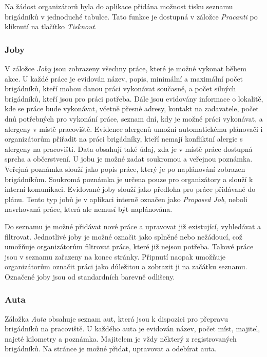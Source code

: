 Na žádost organizátorů byla do aplikace přidána možnost tisku seznamu brigádníků v jednoduché tabulce. Tato funkce je dostupná v záložce \textit{Pracanti} po kliknutí
na tlačítko \textit{Tisknout}.

\subsubsection{Joby}

V záložce \textit{Joby} jsou zobrazeny všechny práce, které je možné vykonat během akce. U každé práce je evidován název, popis, minimální
a maximální počet brigádníků, kteří mohou danou práci vykonávat současně, a počet silných brigádníků, kteří jsou pro práci potřeba. Dále jsou evidovány
informace o lokalitě, kde se práce bude vykonávat, včetně přesné adresy, kontakt na zadavatele, počet dnů potřebných pro vykonání práce, 
seznam dní, kdy je možné práci vykonávat, a alergeny v místě pracoviště. Evidence alergenů umožní automatickému plánovači i organizátorům přiřadit na práci brigádníky, kteří nemají
konfliktní alergie s alergeny na pracovišti. Data obsahují také údaj, zda je v místě práce dostupná sprcha a občerstvení. 
U jobu je možné zadat soukromou a veřejnou poznámka. Veřejná poznámka slouží jako popis práce, který je po naplánování
zobrazen brigádníkům. Soukromá poznámka je určena pouze pro organizátory a slouží k interní komunikaci. Evidované joby slouží jako předloha pro práce přidávané
do plánu. Tento typ jobů je v aplikaci interně označen jako \textit{Proposed Job}, neboli navrhovaná práce, která ale nemusí být naplánována.

Do seznamu je možné přidávat nové práce a upravovat již existující, vyhledávat a filtrovat.
Jednotlivé joby je možné označit jako splněné nebo nežádoucí, což umožňuje organizátorům filtrovat práce, které již nejsou potřeba. Takové práce jsou v seznamu
zařazeny na konec stránky. Připnutí naopak umožňuje organizátorům označit práci jako důležitou a zobrazit ji na začátku seznamu. Označené joby jsou od standardních
barevně odlišeny.

\subsubsection{Auta}

Záložka \textit{Auta} obsahuje seznam aut, která jsou k dispozici pro přepravu brigádníků na pracoviště. U každého auta je evidován název, počet míst, majitel,
najeté kilometry a poznámka. Majitelem je vždy některý z registrovaných brigádníků. Na stránce je možné přidat, upravovat a odebírat auta.

